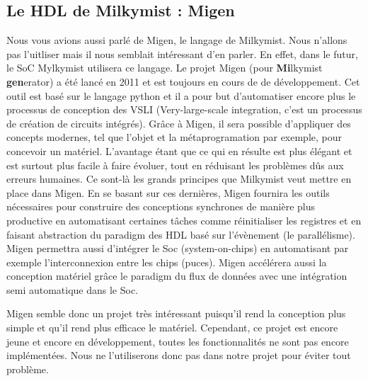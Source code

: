 \subsection{Le HDL de Milkymist : Migen}
\vspace{15px}
Nous vous avions aussi parlé de Migen, le langage de Milkymist. Nous n'allons pas l'uitliser mais il nous semblait intéressant d'en parler. En effet, dans le futur, le SoC Mylkymist utilisera ce langage. Le projet Migen (pour \textbf{Mi}lkymist \textbf{gen}erator) a été lancé en 2011 et est toujours en cours de de développement. Cet outil est basé sur le langage python et il a pour but d'automatiser encore plus le processus de conception des VSLI (Very-large-scale integration, c'est un processus de création de circuits intégrés). Grâce à Migen, il sera possible d'appliquer des concepts modernes, tel que l'objet et la métaprogramation par exemple, pour concevoir un matériel. L'avantage étant que ce qui en résulte est plus élégant et est surtout plus facile à faire évoluer, tout en réduisant les problèmes dûs aux erreurs humaines. Ce sont-là les grands principes que Milkymist veut mettre en place dans Migen. En se basant sur ces dernières, Migen fournira les outils nécessaires pour construire des conceptions synchrones de manière plus productive en automatisant certaines tâches comme réinitialiser les registres et en faisant abstraction du paradigm des HDL basé sur l'évènement (le parallélisme). Migen permettra aussi d'intégrer le Soc (system-on-chips) en automatisant par exemple l'interconnexion entre les chips (puces). Migen accélérera aussi la conception matériel grâce le paradigm du flux de données avec une intégration semi automatique dans le Soc.

Migen semble donc un projet très intéressant puisqu'il rend la conception plus simple et qu'il rend plus efficace le matériel. Cependant, ce projet est encore jeune et encore en développement, toutes les fonctionnalités ne sont pas encore implémentées. Nous ne l'utiliserons donc pas dans notre projet pour éviter tout problème.
